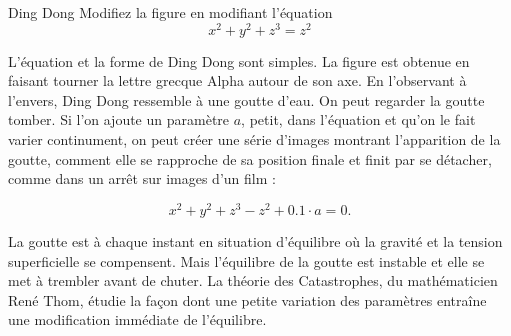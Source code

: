 \begin{surferPage}{Ding Dong}
Modifiez la figure en modifiant l'équation\\

\smallskip
\[x^2	+ y^2	+ z^3	= z^2\]

\singlespacing
L'équation et la forme de Ding Dong sont simples. La figure est obtenue en faisant tourner la lettre grecque Alpha autour de son axe. En l'observant à l'envers, Ding Dong ressemble à une goutte d'eau. On peut regarder la goutte tomber.
\newline
Si l'on ajoute un paramètre $a$, petit, dans l'équation et qu'on le fait varier continument, on peut créer une série d'images montrant l'apparition de la goutte, comment elle se rapproche de sa position finale et finit par se détacher, comme dans un arrêt sur images d'un film :

\[x^2	+ y^2	+ z^3	-z^2+0.1\cdot a=0.\]

La goutte est à chaque instant en situation d'équilibre où la gravité et la tension superficielle se compensent. Mais l'équilibre de la goutte est instable et elle se met à trembler avant de chuter. La théorie des Catastrophes, du mathématicien René Thom, étudie la façon dont une petite variation des paramètres entraîne une modification immédiate de l'équilibre.
\end{surferPage}
